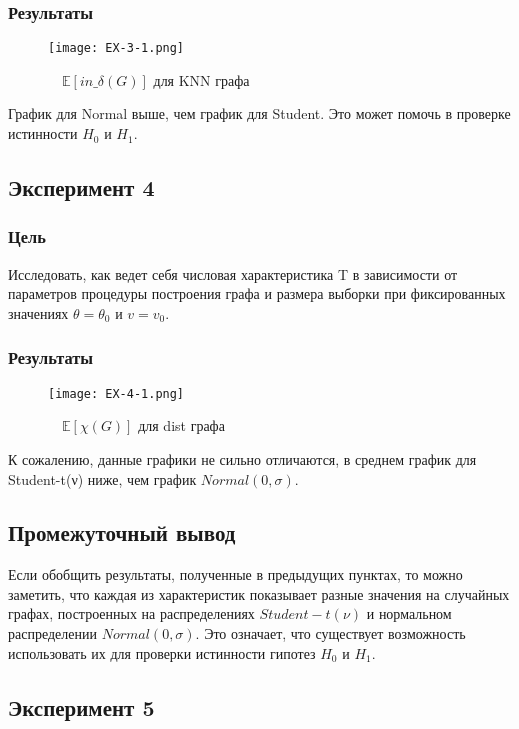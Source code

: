 \documentclass[a4paper, 12pt]{article}
\begin{document}
\subsubsection{Результаты}
\begin{figure}[H]
    \centering
    \texttt{[image: EX-3-1.png]}
    \caption{$\quad \mathbb{E}[in\_\delta(G)]$ для KNN графа}
    \label{fig:uml}
\end{figure}
График для Normal выше, чем график для Student. Это может помочь в проверке истинности $H_0$ и $H_1$. \\

\subsection{Эксперимент 4}
\subsubsection{Цель}
Исследовать, как ведет себя числовая характеристика T в зависимости
от параметров процедуры построения графа и размера выборки при
фиксированных значениях $\theta = \theta_0$ и $v = v_0$.\\
\subsubsection{Результаты}
\begin{figure}[H]
    \centering
    \texttt{[image: EX-4-1.png]}
    \caption{$\quad \mathbb{E}[\chi(G)]$ для dist графа}
    \label{fig:uml}
\end{figure}
К сожалению, данные графики не сильно отличаются, в среднем график для Student-t(ν) ниже, чем график $Normal(0,\sigma)$.

\subsection{Промежуточный вывод}
Если обобщить результаты, полученные в предыдущих пунктах, то можно заметить, что каждая из характеристик показывает разные значения на случайных графах, построенных на распределениях $Student-t(ν)$ и нормальном распределении $Normal(0,\sigma)$. Это означает, что существует возможность использовать их для проверки истинности гипотез $H_0$ и $H_1$.

\subsection{Эксперимент 5}
\end{document}
